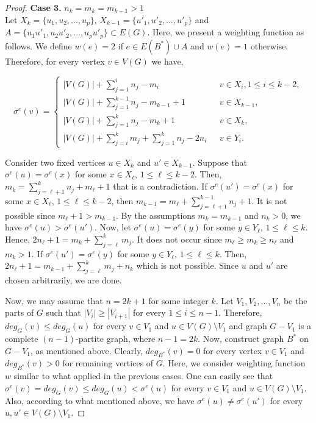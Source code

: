\documentclass[12pt,a4paper]{article}
\begin{document}
\begin{proof}
	\textbf{Case 3.} $n_k = m_k=m_{k-1}>1$\\
	Let $X_{k}=\{u_1,u_2,\ldots ,u_p\}$, $X_{k-1}=\{u'_1,u'_2,\ldots ,u'_p\}$ and $A=\{u_1u'_1, u_2u'_2,\ldots ,u_pu'_{p}\}\subset E(G)$. Here, we present a weighting function as follows. We define  $w(e)=2$ if $e\in E(B^*)\cup A$ and $w(e)=1$ otherwise. Therefore, for every vertex $ v\in V(G) $ we have,
	\begin{center}
		\begin{equation}\label{1}
		\sigma^{e}(v)=
		\left\{
		\begin{array}{ll}
		| V(G)|+\sum _{j=1}^i n_j-m_i & \ \ \ v\in X_i, 1\leq i\leq k-2,  \\
		| V(G)|+\sum _{j=1}^{k-1} n_j -m_{k-1}+1 & \ \ \ v\in X_{k-1},\\
		|V(G)|+\sum _{j=1}^{k} n_j -m_{k}+1 & \ \ \ v\in X_k, \\
		|V(G)|+\sum _{j=i}^k m_j + \sum_{j=1}^k n_j-2n_i & \ \ \ v\in Y_i.
		\end{array}
		\right.
		\end{equation}
	\end{center}
	Consider two fixed vertices $u\in X_k$ and $u'\in X_{k-1}$. Suppose that $\sigma^{e}(u)=\sigma^{e}(x)$ for some  $x\in X_{\ell}$, $1\leq \ell \leq k-2. $ Then, $ m_{k}=\sum _{j={\ell}+1}^k n_j+m_{\ell}+1$ that is a contradiction. If $\sigma^{e}(u')=\sigma^{e}(x)$ for some  $x\in X_{\ell}$, $1\leq \ell \leq k-2 $, then $ m_{k-1}=m_{\ell}+\sum _{j={\ell}+1}^{k-1} n_j+1$. It is not possible since $m_{\ell}+1>m_{k-1}$. By the assumptions $m_{k}=m_{k-1}$ and $n_k >0$, we have  $\sigma^{e}(u)>\sigma^{e}(u')$. Now, let $\sigma^{e}(u)=\sigma^{e}(y)$ for some  $y\in Y_{\ell}$, $1\leq \ell \leq k. $ Hence, $2n_{\ell}+1=m_{k}+ \sum _{j={\ell}}^{k} m_j$. It does not occur since $m_{\ell}\geq m_k \geq n_{\ell}$ and $m_k >1$. If $\sigma^{e}(u')=\sigma^{e}(y)$ for some  $y\in Y_{\ell}$, $1\leq \ell \leq k. $ Then, $2n_{\ell}+1=m_{k-1}+\sum _{j={\ell}}^{k} m_j +n_k$ which is not possible.
	Since $u$ and $u'$ are chosen arbitrarily, we are done.
	
	Now, we may assume that $n=2k+1$ for some integer $k$. Let $V_1,V_2,\ldots ,V_{n}$ be the  parts of $G$ such that $|V_i|\geq |V_{i+1}|$ for every $1\leq i \leq n-1$. Therefore, $deg_G(v)\leq deg_G(u)$ for every $v\in V_1$ and $u \in V(G)\setminus V_1$ and  graph $G-V_1$ is a complete $(n-1)$-partite graph, where $n-1=2k$. Now, construct graph $B^*$ on $G-V_1$, as mentioned above. Clearly, $deg_{B^*}(v)=0$ for every vertex $v\in V_1$ and  $deg_{B^*}(v)>0$ for remaining vertices of $G$. Here, we consider weighting function $w$ similar to what applied in the previous cases. One can easily see that $\sigma^{e}(v)=deg_{G}(v)\leq deg_{G}(u)<\sigma^{e}(u)$ for every  $v\in V_1$ and $u\in V(G)\setminus V_1$. Also, according to what mentioned above, we have $\sigma^{e}(u)\neq \sigma^{e}(u')$ for every $u,u'\in V(G)\setminus V_1$.
\end{proof}
\end{document}
